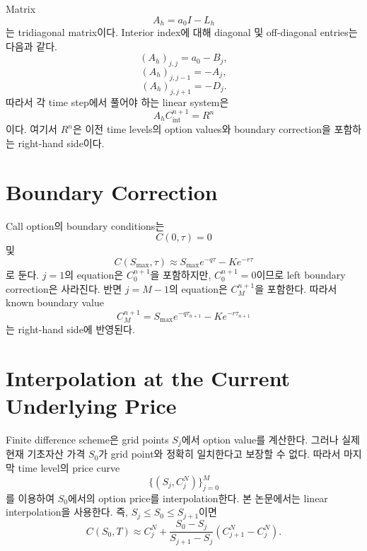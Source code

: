 \documentclass[11pt,a4paper]{report}
\begin{document}
Matrix
\[
A_h=a_0I-L_h
\]
는 tridiagonal matrix이다. Interior index에 대해 diagonal 및 off-diagonal entries는 다음과 같다.
\[
(A_h)_{j,j}
=
a_0-B_j,
\]
\[
(A_h)_{j,j-1}
=
-A_j,
\]
\[
(A_h)_{j,j+1}
=
-D_j.
\]
따라서 각 time step에서 풀어야 하는 linear system은
\[
A_hC_{\mathrm{int}}^{n+1}
=
R^n
\]
이다. 여기서 $R^n$은 이전 time levels의 option values와 boundary correction을 포함하는 right-hand side이다.

\section{Boundary Correction}

Call option의 boundary conditions는
\[
C(0,\tau)=0
\]
및
\[
C(S_{\max},\tau)
\approx
S_{\max}e^{-q\tau}
-
Ke^{-r\tau}
\]
로 둔다. $j=1$의 equation은 $C_0^{n+1}$을 포함하지만, $C_0^{n+1}=0$이므로 left boundary correction은 사라진다. 반면 $j=M-1$의 equation은 $C_M^{n+1}$을 포함한다. 따라서 known boundary value
\[
C_M^{n+1}
=
S_{\max}e^{-q\tau_{n+1}}
-
Ke^{-r\tau_{n+1}}
\]
는 right-hand side에 반영된다.

\section{Interpolation at the Current Underlying Price}

Finite difference scheme은 grid points $S_j$에서 option value를 계산한다. 그러나 실제 현재 기초자산 가격 $S_0$가 grid point와 정확히 일치한다고 보장할 수 없다. 따라서 마지막 time level의 price curve
\[
\{(S_j,C_j^N)\}_{j=0}^{M}
\]
를 이용하여 $S_0$에서의 option price를 interpolation한다. 본 논문에서는 linear interpolation을 사용한다. 즉, $S_j\le S_0\le S_{j+1}$이면
\[
C(S_0,T)
\approx
C_j^N
+
\frac{S_0-S_j}{S_{j+1}-S_j}
\left(
C_{j+1}^N-C_j^N
\right).
\]
\end{document}
